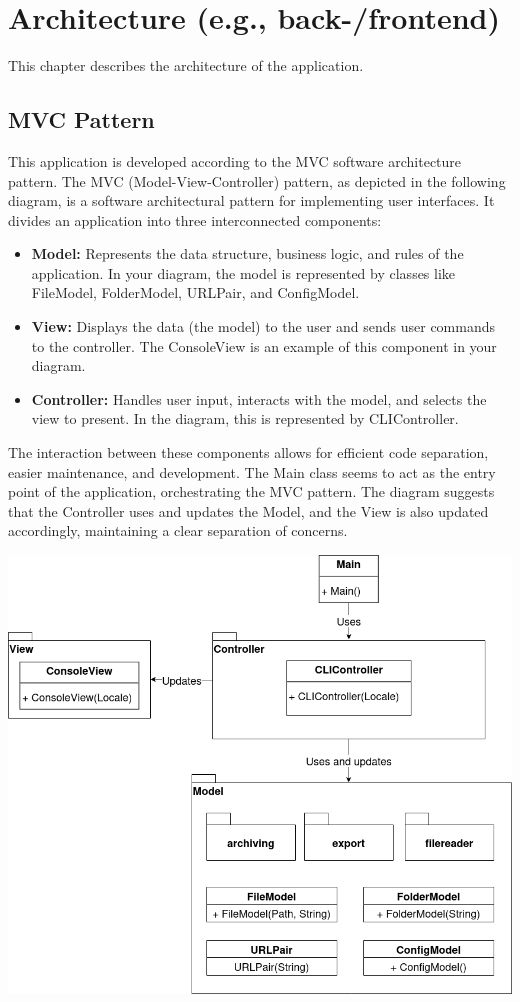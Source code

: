 \section{Architecture (e.g., back-/frontend)}
This chapter describes the architecture of the application. 

\subsection{MVC Pattern}
This application is developed according to the MVC software architecture pattern. 
The MVC (Model-View-Controller) pattern, as depicted in the following diagram, is a software architectural pattern for implementing user interfaces. It divides an application into three interconnected components:

\begin{itemize}
    \item \textbf{Model:} Represents the data structure, business logic, and rules of the application. In your diagram, the model is represented by classes like FileModel, FolderModel, URLPair, and ConfigModel.
    \item \textbf{View:} Displays the data (the model) to the user and sends user commands to the controller. The ConsoleView is an example of this component in your diagram.
    \item \textbf{Controller:} Handles user input, interacts with the model, and selects the view to present. In the diagram, this is represented by CLIController.
    
\end{itemize}

The interaction between these components allows for efficient code separation, easier maintenance, and development. The Main class seems to act as the entry point of the application, orchestrating the MVC pattern. The diagram suggests that the Controller uses and updates the Model, and the View is also updated accordingly, maintaining a clear separation of concerns.

\includegraphics[width=1\textwidth]{diagrams/mvc_diagram-Highlevel_MVC.png}
\clearpage



